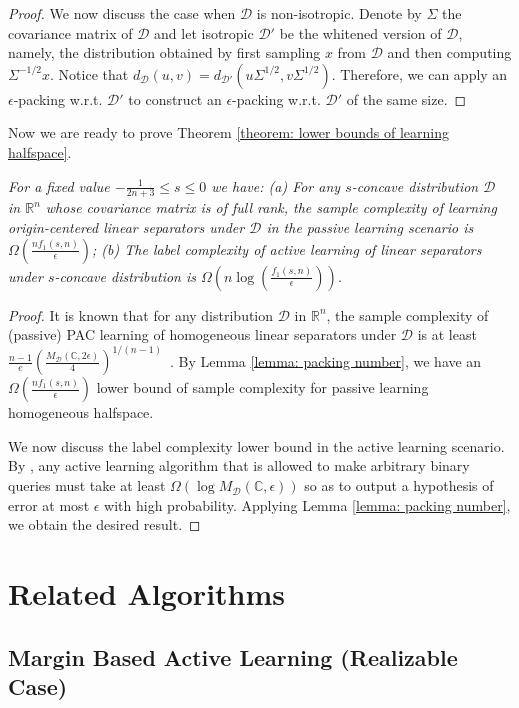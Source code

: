 \documentclass[11pt]{article}
\newcommand{\cD}{\mathcal{D}}
\newcommand{\R}{\mathbb{R}}
\begin{document}
{{{{\begin{proof}
We now discuss the case when $\cD$ is non-isotropic. Denote by $\Sigma$ the covariance matrix of $\cD$ and let isotropic $\cD'$ be the whitened version of $\cD$, namely, the distribution obtained by first sampling $x$ from $\cD$ and then computing $\Sigma^{-1/2}x$. Notice that $d_\cD(u,v)=d_{\cD'}(u\Sigma^{1/2},v\Sigma^{1/2})$. Therefore, we can apply an $\epsilon$-packing w.r.t. $\cD'$ to construct an $\epsilon$-packing w.r.t. $\cD'$ of the same size.
\end{proof}

Now we are ready to prove Theorem \ref{theorem: lower bounds of learning halfspace}.
\medskip

\emph{For a fixed value $-\frac{1}{2n+3}\le s\le 0$ we have: (a) For any $s$-concave distribution $\cD$ in $\R^n$ whose covariance matrix is of full rank, the sample complexity of learning origin-centered linear separators under $\cD$ in the passive learning scenario is $\Omega\left(\frac{nf_1(s,n)}{\epsilon}\right)$; (b) The label complexity of active learning of linear separators under $s$-concave distribution is $\Omega\left(n\log\left(\frac{f_1(s,n)}{\epsilon}\right)\right)$.}

\medskip
\begin{proof}
It is known that for any distribution $\cD$ in $\R^n$, the sample complexity of (passive) PAC learning of homogeneous linear separators under $\cD$ is at least $\frac{n-1}{e}\left(\frac{M_\cD(\mathbb{C},2\epsilon)}{4}\right)^{1/(n-1)}$~\cite{long1995sample}. By Lemma \ref{lemma: packing number}, we have an $\Omega\left(\frac{nf_1(s,n)}{\epsilon}\right)$ lower bound of sample complexity for passive learning homogeneous halfspace.

We now discuss the label complexity lower bound in the active learning scenario. By \cite{kulkarni1993active}, any active learning algorithm that is allowed to make arbitrary binary queries must take at least $\Omega(\log M_{\cD}(\mathbb{C},\epsilon))$ so as to output a hypothesis of error at most $\epsilon$ with high probability. Applying Lemma \ref{lemma: packing number}, we obtain the desired result.
\end{proof}


\section{Related Algorithms}
\label{section: algorithms}

\subsection{Margin Based Active Learning (Realizable Case)}

}}}}
\end{document}

